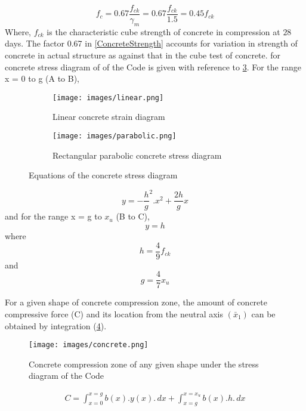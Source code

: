\begin{equation}
f_c = 0.67\frac{f_{ck}}{\gamma_m} = 0.67\frac{f_{ck}}{1.5}=0.45 f_{ck}
\label{ConcreteStrength}
\end{equation}
Where, $f_{ck}$ is the characteristic cube strength of concrete in
compression at $28$ days. The factor 0.67 in \eqn \ref{ConcreteStrength}
accounts for variation in strength of concrete in actual structure as
against that in the cube test of concrete. {\eqn} for concrete stress diagram
of  of the Code is given with reference to
\fig \ref{fig:Equations of the concrete stress diagram}. For the
range x = 0 to g (A to B),
\begin{figure}
\begin{subfigure}{0.5\textwidth}
\centering
\texttt{[image: images/linear.png]}
\caption{Linear concrete strain diagram}
\label{fig:linear}
\end{subfigure}
%
\begin{subfigure}{0.5\textwidth}
\centering
\texttt{[image: images/parabolic.png]}
\caption{Rectangular parabolic concrete stress diagram}
\label{fig:parabolic}
\end{subfigure}
\caption{Equations of the concrete stress diagram}
\label{fig:Equations of the concrete stress diagram}
\end{figure}

\begin{equation}
y=-\frac{h}{g}^2.x^2+\frac{2h}{g} x
\label{ConcreteStress1}  
\end{equation}
and for the range x = g to $x_{u}$ (B to C),
\begin{equation}
y=h
\label{ConcreteStress2}
\end{equation}
where
$$h=\frac{4}{9}f_{ck}$$
and
$$g=\frac{4}{7}x_u$$

For a given shape of concrete compression zone, the amount of concrete
compressive force (C) and its location from the neutral axis ${(\bar x_1)}$
can be obtained by integration (\fig \ref{fig:ConcreteCompressionZone}).
\begin{figure}
\centering
\texttt{[image: images/concrete.png]}
\caption{Concrete compression zone of any given shape under the stress diagram of the Code}
\label{fig:ConcreteCompressionZone}
\end{figure}
\begin{align}
C=\int_{x=0}^{x=g}b(x).y(x).\,dx+\int_{{x=g}}^{x=x_u}b(x).h.\,dx
\label{ConcreteCompressionForce1}
\end{align}

